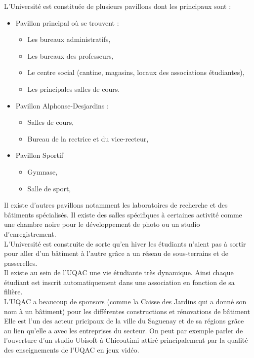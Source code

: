 L’Université est constituée de plusieurs pavillons dont les principaux sont :
\begin{itemize}
  \item Pavillon principal où se trouvent :
  \begin{itemize}
      \item Les bureaux administratifs,
      \item Les bureaux des professeurs,
      \item Le centre social (cantine, magasins, locaux des associations étudiantes),
      \item Les principales salles de cours.
  \end{itemize}

  \item Pavillon Alphonse-Desjardins :
  \begin{itemize}
      \item Salles de cours,
      \item Bureau de la rectrice et du vice-recteur,
  \end{itemize}

  \item Pavillon Sportif
  \begin{itemize}
      \item Gymnase,
      \item Salle de sport,
  \end{itemize}

\end{itemize}
Il existe d’autres pavillons notamment les laboratoires de recherche et des bâtiments spécialisés. Il existe des salles spécifiques à certaines activité comme une chambre noire pour le développement de photo ou un studio d’enregistrement.\\

L’Université est construite de sorte qu’en hiver les étudiants n’aient pas à sortir pour aller d’un
bâtiment à l’autre grâce a un réseau de sous-terrains et de passerelles.\\

Il existe au sein de l’UQAC une vie étudiante très dynamique. Ainsi chaque étudiant est inscrit automatiquement dans une association en fonction de sa filière.\\

L’UQAC a beaucoup de sponsors (comme la Caisse des Jardins qui a donné son nom à un bâtiment) pour les différentes constructions et rénovations de bâtiment Elle est l’un des acteur pricipaux de la ville du Saguenay et de sa régions grâce au lien qu’elle a avec les entreprises du secteur. On peut par exemple parler de l’ouverture d’un studio Ubisoft
à Chicoutimi attiré principalement par la qualité des enseignements de l’UQAC en jeux vidéo.\\


